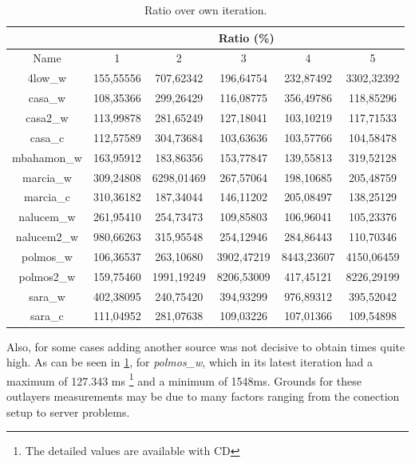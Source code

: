 \begin{table}[!ht]
\begin{center}
\begin{tabular}{|c||c|c|c|c|c||}
 \hline
 & \multicolumn{5}{|c|}{ Ratio (\%)} \\ \hline
Name 		& 1			& 2			 & 3	        & 4				& 5 			\\ \hline \hline
4low\_w		& 155,55556	& 707,62342	 & 196,64754	& 232,87492		& 3302,32392	\\ \hline
casa\_w		& 108,35366	& 299,26429	 & 116,08775	& 356,49786		& 118,85296 	\\ \hline
casa2\_w	& 113,99878	& 281,65249	 & 127,18041	& 103,10219		& 117,71533 	\\ \hline
casa\_c		& 112,57589	& 304,73684	 & 103,63636	& 103,57766		& 104,58478 	\\ \hline
mbahamon\_w	& 163,95912	& 183,86356	 & 153,77847	& 139,55813		& 319,52128 	\\ \hline
marcia\_w	& 309,24808	& 6298,01469 & 267,57064	& 198,10685		& 205,48759 	\\ \hline
marcia\_c	& 310,36182	& 187,34044	 & 146,11202	& 205,08497		& 138,25129 	\\ \hline
nalucem\_w	& 261,95410	& 254,73473	 & 109,85803	& 106,96041		& 105,23376 	\\ \hline
nalucem2\_w	& 980,66263	& 315,95548	 & 254,12946	& 284,86443		& 110,70346 	\\ \hline
polmos\_w	& 106,36537	& 263,10680	 & 3902,47219	& 8443,23607	& 4150,06459 	\\ \hline
polmos2\_w	& 159,75460	& 1991,19249 & 8206,53009	& 417,45121		& 8226,29199 	\\ \hline
sara\_w		& 402,38095	& 240,75420	 & 394,93299	& 976,89312		& 395,52042 	\\ \hline
sara\_c		& 111,04952	& 281,07638	 & 109,03226	& 107,01366		& 109,54898 	\\ \hline
\end{tabular}
\caption[Page Benchmark: Ratio over own iteration]{Ratio over own iteration.}
\label{table:variationratio}
\end{center}
\end{table}

Also, for some cases adding another source was not decisive to obtain times
quite high. As can be seen in \ref{table:variationratio}, for
\textit{polmos\_w}, which in its latest iteration had a maximum of 127.343 ms
\footnote{The detailed values are available with CD} and a minimum of 1548ms.
Grounds for these outlayers measurements may be due to many factors ranging
from the conection setup to server problems.
